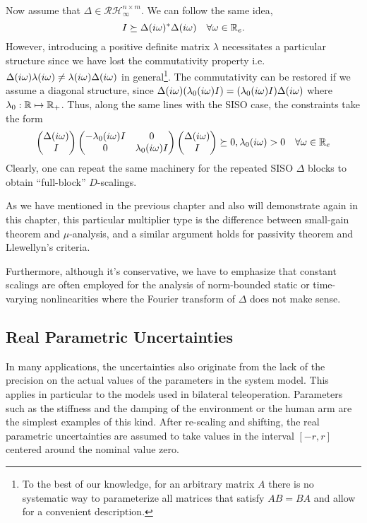 Now assume that $\Delta\in\mathcal{RH}^{n\times m}_\infty$. We can follow the same idea, 
\[
I\succeq \Delta(i\omega)^*\Delta(i\omega) \quad \forall\omega\in\mathbb{R}_e.
\]
However, introducing a positive definite matrix $\lambda$ necessitates a particular structure
since we have lost the commutativity property i.e. $\Delta(i\omega)\lambda(i\omega) \neq \lambda(i\omega)
\Delta(i\omega)$ in general\footnote{To the best of our knowledge, for an arbitrary matrix $A$ there is no systematic way to 
parameterize all matrices that satisfy $AB=BA$ and allow for a convenient description.}. The commutativity 
can be restored if we assume a diagonal structure, since $\Delta(i\omega)(\lambda_0(i\omega)I) = 
(\lambda_0(i\omega)I)\Delta(i\omega)$ where $\lambda_0:\mathbb{R}\mapsto\mathbb{R}_+$. Thus, along the same lines 
with the SISO case, the constraints take the form 
\[
\begin{pmatrix}\Delta(i\omega) \\ I\end{pmatrix}\begin{pmatrix}-\lambda_0(i\omega)I &0\\0 &\lambda_0(i\omega)I\end{pmatrix}\begin{pmatrix}\Delta(i\omega) \\ I\end{pmatrix}
\succeq 0, \lambda_0(i\omega)>0 \quad \forall \omega\in\mathbb{R}_e 
\]
Clearly, one can repeat the same machinery for the repeated SISO $\Delta$ blocks to obtain 
``full-block'' $D$-scalings. 

As we have mentioned in the previous chapter and also will demonstrate again in this chapter, 
this particular multiplier type is the difference between small-gain theorem and $\mu$-analysis,
and a similar argument holds for passivity theorem and Llewellyn's criteria.

Furthermore, although it's conservative, we have to emphasize that constant scalings are often 
employed for the analysis of norm-bounded static or time-varying nonlinearities where the Fourier 
transform of $\Delta$ does not make sense. 



\subsection{Real Parametric Uncertainties}\label{sec:ltvenv}
In many applications, the uncertainties also originate from the lack of the precision
on the actual values of the parameters in the system model. This applies in
particular to the models used in bilateral teleoperation. Parameters such as the
stiffness and the damping of the environment or the human arm are the simplest
examples of this kind. After re-scaling and shifting, the real parametric uncertainties
are assumed to take values in the interval $\left[ -r,r \right]$ centered around
the nominal value zero.

